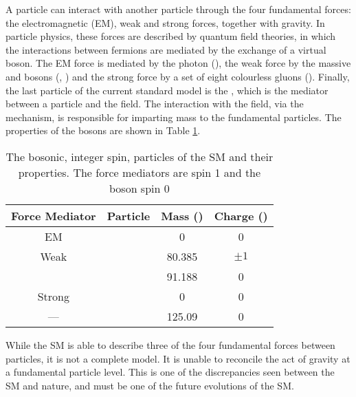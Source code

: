 A particle can interact with another particle through the four fundamental forces: the electromagnetic (EM), weak and strong forces, together with gravity. 
In particle physics, these forces are described by quantum field theories, in which the interactions between fermions are mediated by the exchange of a virtual boson.
The EM force is mediated by the photon (\photon{}), the weak force by the massive \Wboson{} and \Zboson{} bosons (\Wboson{}, \Zboson{}) and the strong force by a set of eight colourless gluons (\gluon{}). 
Finally, the last particle of the current standard model is the \Hboson{}, which is the mediator between a particle and the \BEH{} field.
The interaction with the \BEH{} field, via the \BEH{} mechanism, is responsible for imparting mass to the fundamental particles. 
The properties of the bosons are shown in Table \ref{tb:SM_Bosons}.

\begin{table}
	\centering
	\footnotesize
	\caption{The bosonic, integer spin, particles of the SM and their properties. The force mediators are spin 1 and the \Hboson{} boson spin 0}
	\label{tb:SM_Bosons}
	\begin{tabular}{cccc}
		\textbf{Force Mediator} 	& \textbf{Particle} 	& \textbf{Mass (\GeVcc{})} 	& \textbf{Charge (\electron{})} \\
		\hline
		EM 							& \photon{} 			& 0 						& 0 \\	 
		Weak 						& \Wboson{} 			& 80.385 					& $\pm1$ \\
									& \Zboson{}	 			& 91.188 					& 0 \\	
		Strong 						& \gluon{}				& 0 						& 0	\\	 
		---							& \Hboson{}				& 125.09 					& 0 \\	 
	\end{tabular}
\end{table}

While the SM is able to describe three of the four fundamental forces between particles, it is not a complete model.
It is unable to reconcile the act of gravity at a fundamental particle level.
This is one of the discrepancies seen between the SM and nature, and must be one of the future evolutions of the SM.

